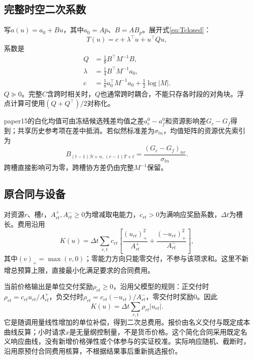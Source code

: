 \documentclass[UTF8,11pt,a4paper,fontset=fandol]{ctexart}
\newcommand{\code}[1]{\texttt{\detokenize{#1}}}
\numberwithin{equation}{section}
\begin{document}
\subsection{完整时空二次系数}
写$a(u)=a_0+Bu$，其中$a_0=A\bar p$、$B=AB_p$。展开式\eqref{eq:Tclosed}：
\begin{equation}
\boxed{T(u)=c+\lambda^\top u+u^\top Qu,}
\end{equation}
系数是
\begin{align}
Q&=\tfrac18B^\top M^{-1}B,\\
\lambda&=\tfrac14B^\top M^{-1}a_0,\\
c&=\tfrac18a_0^\top M^{-1}a_0+\tfrac12\log|M|.
\label{eq:coefficients}
\end{align}
$Q\succeq0$。完整$C$含跨时相关时，$Q$也通常跨时耦合，不能只存各时段的对角块。浮点计算可使用$(Q+Q^\top)/2$对称化。

paper15的白化均值可由冻结候选残差均值之差$a_c^0-a_f^0$和资源影响差$G_c-G_f$得到；共享历史参考项在差中抵消。若似然标准差为$\sigma_{tn}$，均值矩阵的资源优先索引为
\begin{equation}
B_{(t-1)N+n,\,(r-1)T+t}
=\frac{(G_c-G_f)_{nr}}{\sigma_{tn}}.
\end{equation}
跨槽直接影响可为零，跨槽协方差仍由完整$M^{-1}$保留。

\subsection{原合同与设备}
对资源$r$、槽$t$，$A^+_{rt},A^-_{rt}\ge0$为增减取电能力，$c_{rt}>0$为满响应奖励系数，$\Delta t$为槽长。费用沿用
\begin{equation}
K(u)=\Delta t\sum_{r,t}c_{rt}
\left[\frac{(u_{rt})_+^2}{A^+_{rt}}+
\frac{(-u_{rt})_+^2}{A^-_{rt}}\right],
\label{eq:cost}
\end{equation}
其中$(v)_+=\max(v,0)$；零能力方向只能零交付，不参与该项求和。这里不新增总预算上限，直接最小化满足要求的合同费用。

当前价格输出是单位交付奖励$\rho_{rt}\ge0$，沿用父模型\code{unit_reward}的规则：正交付时$\rho_{rt}=c_{rt}u_{rt}/A^+_{rt}$，负交付时$\rho_{rt}=c_{rt}(-u_{rt})/A^-_{rt}$，零交付时奖励0。因此
\begin{equation}
K(u)=\Delta t\sum_{r,t}\rho_{rt}|u_{rt}|.
\end{equation}
它是随调用量线性增加的单位补偿，得到二次总费用。报价由名义交付与既定成本曲线反算；小时请求$x$是无量纲控制量，不是货币价格。这个简化合同采用既定名义响应曲线，没有新增价格弹性或个体参与的实证校准。实际响应随机、截断时，沿用原预付合同费用核算，不根据结果事后重新挑选报价。
\end{document}
